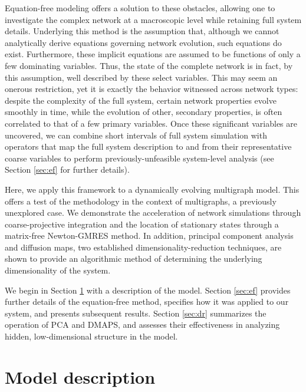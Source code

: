 \documentclass[12pt]{article}
\newcommand\ignore[1]{}
\begin{document}
\begin{onehalfspace}
Equation-free modeling offers a solution to these obstacles\ignore{circumvents these obstacles}, allowing one to investigate the complex network at a macroscopic level while retaining full system details. Underlying this method is the assumption that, although we cannot analytically derive equations governing network evolution, such equations do exist. Furthermore, these implicit equations are assumed to be functions of only a few dominating variables. Thus, the state of the complete network is in fact, by this assumption, well described by these select variables. This may seem an onerous restriction, yet it is exactly the behavior witnessed across network types: despite the complexity of the full system, certain network properties evolve smoothly in time, while the evolution of other, secondary properties, is often correlated to that of a few primary variables. Once these significant variables are uncovered, we can combine short intervals of full system simulation with operators that map the full system description to and from their representative coarse variables to perform previously-unfeasible system-level analysis (see Section \ref{sec:ef} for further details). \par

Here, we apply this framework to a dynamically evolving multigraph model. This offers a test of the methodology in the context of multigraphs, a previously unexplored case. We demonstrate the acceleration of network simulations through coarse-projective integration and the location of stationary states through a matrix-free Newton-GMRES method. In addition, principal component analysis and diffusion maps, two established dimensionality-reduction techniques, are shown to provide an algorithmic method of determining the underlying dimensionality of the system. \par

We begin in Section \ref{sec:m} with a description of the model. Section \ref{sec:ef} provides further details of the equation-free method, specifies how it was applied to our system, and presents subsequent results. Section \ref{sec:dr} summarizes the operation of PCA and DMAPS, and assesses their effectiveness in analyzing hidden, low-dimensional structure in the model.

\section{Model description}
\label{sec:m}


\end{onehalfspace}
\end{document}
